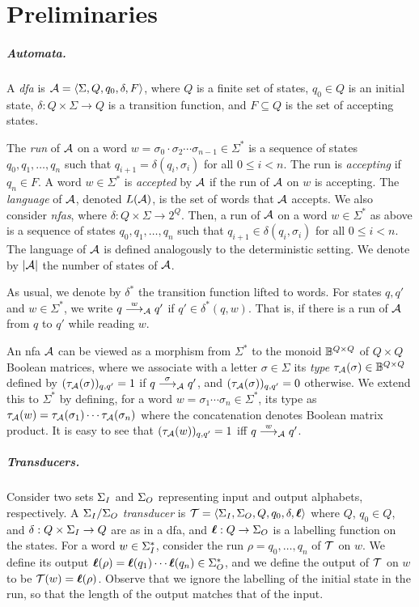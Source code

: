 \chapter{Preliminaries}
\label{chap:prelims}

\paragraph*{Automata.}
A \emph{\gls{dfa}} is $\mathcal{A}=\left< \Sigma,Q,q_0,\delta,F\right>$, where $Q$ is a finite set of states, $q_0 \in Q$ is an initial state, $\delta: Q\times \Sigma \to Q$ is a transition function, and $F\subseteq Q$ is the set of accepting states. 

The \emph{run} of $\mathcal{A}$ on a word $w=\sigma_0 \cdot \sigma_2 \cdots \sigma_{n-1}\in \Sigma^*$ is a sequence of states $q_0,q_1,\ldots,q_n$ such that $q_{i+1} = \delta(q_i,\sigma_{i})$ for all $0\le i<n$. 
The run is \emph{accepting} if $q_n\in F$. A word $w \in \Sigma^*$ is \emph{accepted} by $\mathcal{A}$ if the run of $\mathcal{A}$ on $w$ is accepting. The \emph{language} of $\mathcal{A}$, denoted $L(\mathcal{A})$, is the set of words that $\mathcal{A}$ accepts. 
We also consider \emph{\glspl{nfa}}, where $\delta:Q\times \Sigma\to 2^Q$. Then, a run of $\mathcal{A}$ on a word $w\in \Sigma^*$ as above is a sequence of states $q_0,q_1,\ldots,q_n$ such that $q_{i+1} \in \delta(q_i,\sigma_{i})$ for all $0\le i<n$. The language of $\mathcal{A}$ is defined analogously to the deterministic setting.
We denote by $|\mathcal{A}|$ the number of states of $\mathcal{A}$.

As usual, we denote by $\delta^*$ the transition function lifted to words.
For states $q,q'$ and $w\in \Sigma^*$, we write $q\stackrel{w}{\longrightarrow}_{\mathcal{A}}q'$ if $q'\in \delta^*(q,w)$. That is, if there is a run of $\mathcal{A}$ from $q$ to $q'$ while reading $w$.

An \gls{nfa} $\mathcal{A}$ can be viewed as a morphism from $\Sigma^*$ to the monoid $\mathbb{B}^{Q\times Q}$ of $Q\times Q$ Boolean matrices, where we associate with a letter $\sigma\in \Sigma$ its \emph{type} $\tau_{\mathcal{A}}(\sigma)\in \mathbb{B}^{Q\times Q}$ defined by $(\tau_{\mathcal{A}}(\sigma))_{q,q'}=1$ if $q\stackrel{\sigma}{\longrightarrow}_{\mathcal{A}}q'$, and $(\tau_{\mathcal{A}}(\sigma))_{q,q'}=0$ otherwise. We extend this to $\Sigma^*$ by defining, for a word $w=\sigma_1\cdots \sigma_n\in \Sigma^*$, its type as $\tau_{\mathcal{A}}(w)=\tau_{\mathcal{A}}(\sigma_1)\cdots \tau_{\mathcal{A}}(\sigma_n)$ where the concatenation denotes Boolean matrix product. It is easy to see that $(\tau_{\mathcal{A}}(w))_{q,q'}=1$ iff $q\stackrel{w}{\longrightarrow}_{\mathcal{A}}q'$.

\paragraph*{Transducers.}
Consider two sets $\Sigma_{I}$ and $\Sigma_{O}$ representing input and output alphabets, respectively. A \emph{$\Sigma_{I}/\Sigma_{O}$ transducer} is $\mathcal{T}=\left< \Sigma_{I},\Sigma_{O},Q,q_0,\delta,\boldsymbol{\ell}\right>$ where $Q$, $q_0\in Q$, and $\delta:Q\times \Sigma_{I}\to Q$ are as in a \gls{dfa}, and $\boldsymbol{\ell}:Q\to \Sigma_{O}$ is a labelling function on the states. For a word $w\in \Sigma_{I}^*$, consider the run $\rho=q_0,\ldots,q_n$ of $\mathcal{T}$ on $w$. We define its output $\boldsymbol{\ell}(\rho)=\boldsymbol{\ell}(q_1)\cdots\boldsymbol{\ell}(q_n)\in \Sigma_{O}^*$, and we define the output of $\mathcal{T}$ on $w$ to be $\mathcal{T}(w)=\boldsymbol{\ell}(\rho)$. Observe that we ignore the labelling of the initial state in the run, so that the length of the output matches that of the input.

